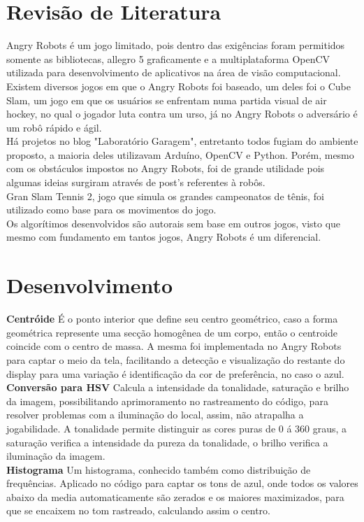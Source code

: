 \documentclass[12pt,openright,twoside,a4paper,brazil]{abntex2}
\begin{document}
\section*{Revisão de Literatura}

Angry Robots é um jogo limitado, pois dentro das exigências foram permitidos somente as bibliotecas, allegro 5 graficamente e a multiplataforma OpenCV utilizada para desenvolvimento de aplicativos na área de visão computacional. \\
Existem diversos jogos em que o Angry Robots foi baseado, um deles foi o Cube Slam, um jogo em que os usuários se enfrentam numa partida visual de air hockey, no qual o jogador luta contra um urso, já no Angry Robots o adversário é um robô rápido e ágil. \\
Há projetos no blog "Laboratório Garagem", entretanto todos fugiam do ambiente proposto, a maioria deles utilizavam Arduíno, OpenCV e Python. Porém, mesmo com os obstáculos impostos no Angry Robots, foi de grande utilidade pois algumas ideias surgiram através de post's referentes à robôs. \\
Gran Slam Tennis 2, jogo que simula os grandes campeonatos de tênis, foi utilizado como base para os movimentos do jogo. \\ 
Os algorítimos desenvolvidos são autorais sem base em outros jogos, visto que mesmo com fundamento em tantos jogos, Angry Robots é um diferencial.

\section*{Desenvolvimento}

\textbf{Centróide} 
É o ponto interior que define seu centro geométrico, caso a forma geométrica represente uma secção homogênea de um corpo, então o centroide coincide com o centro de massa. A mesma foi implementada no Angry Robots para captar o meio da tela, facilitando a detecção e visualização do restante do display para uma variação é identificação da cor de preferência, no caso o azul. \\
\textbf{Conversão para HSV}
Calcula a intensidade da tonalidade, saturação e brilho da imagem, possibilitando aprimoramento no rastreamento do código, para resolver problemas com a iluminação do local, assim, não atrapalha a jogabilidade. A tonalidade permite distinguir as cores puras de 0 á 360 graus, a saturação verifica a intensidade da pureza da tonalidade, o brilho verifica a iluminação da imagem. \\
\textbf{Histograma}
Um histograma, conhecido também como distribuição de frequências. Aplicado no código para captar os tons de azul, onde todos os valores abaixo da media automaticamente são zerados e os maiores maximizados, para que se encaixem no tom rastreado, calculando assim o centro.
\end{document}

